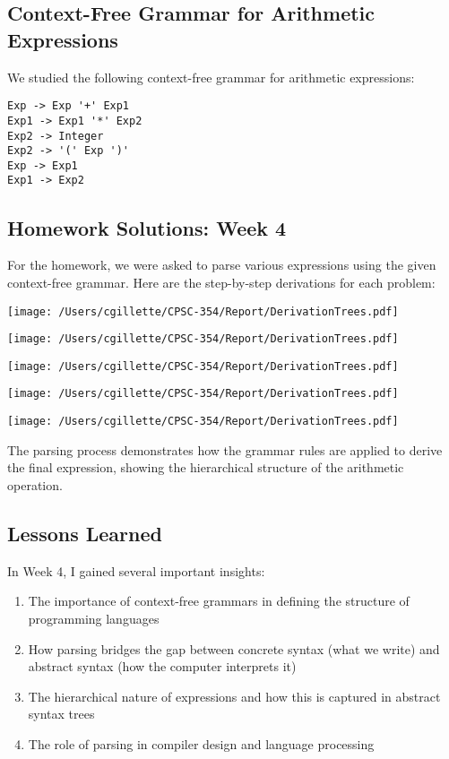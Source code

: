 \documentclass{article}
\begin{document}
\subsection*{Context-Free Grammar for Arithmetic Expressions}

We studied the following context-free grammar for arithmetic expressions:

\begin{verbatim}
Exp -> Exp '+' Exp1 
Exp1 -> Exp1 '*' Exp2              
Exp2 -> Integer            
Exp2 -> '(' Exp ')'  
Exp -> Exp1             
Exp1 -> Exp2
\end{verbatim}

\subsection*{Homework Solutions: Week 4}

For the homework, we were asked to parse various expressions using the given context-free grammar. Here are the step-by-step derivations for each problem:

\texttt{[image: /Users/cgillette/CPSC-354/Report/DerivationTrees.pdf]}

\texttt{[image: /Users/cgillette/CPSC-354/Report/DerivationTrees.pdf]}

\texttt{[image: /Users/cgillette/CPSC-354/Report/DerivationTrees.pdf]}

\texttt{[image: /Users/cgillette/CPSC-354/Report/DerivationTrees.pdf]}

\texttt{[image: /Users/cgillette/CPSC-354/Report/DerivationTrees.pdf]}

The parsing process demonstrates how the grammar rules are applied to derive the final expression, showing the hierarchical structure of the arithmetic operation.

\subsection*{Lessons Learned}

In Week 4, I gained several important insights:

\begin{enumerate}
    \item The importance of context-free grammars in defining the structure of programming languages
    \item How parsing bridges the gap between concrete syntax (what we write) and abstract syntax (how the computer interprets it)
    \item The hierarchical nature of expressions and how this is captured in abstract syntax trees
    \item The role of parsing in compiler design and language processing
\end{enumerate}
\end{document}
